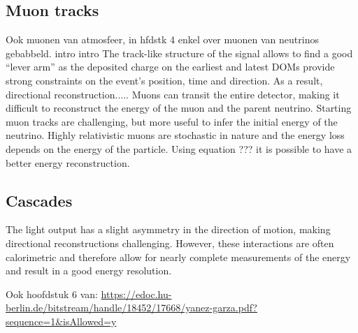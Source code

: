 \subsection{Muon tracks}
Ook muonen van atmosfeer, in hfdstk 4 enkel over muonen van neutrinos gebabbeld.
intro intro
The track-like structure of the signal allows to find a good ``lever arm'' as the deposited charge on the earliest and latest DOMs provide strong constraints on the event's position, time and direction. As a result, directional reconstruction..... Muons can transit the entire detector, making it difficult to reconstruct the energy of the muon and the parent neutrino. Starting muon tracks are challenging, but more useful to infer the initial energy of the neutrino. Highly relativistic muons are stochastic in nature and the energy loss depends on the energy of the particle. Using equation ??? it is possible to have a better energy reconstruction.
\subsection{Cascades}
The light output has a slight asymmetry in the direction of motion, making directional reconstructions challenging. However, these interactions are often calorimetric and therefore allow for nearly complete measurements of the energy and result in a good energy resolution.




Ook hoofdstuk 6 van: \url{https://edoc.hu-berlin.de/bitstream/handle/18452/17668/yanez-garza.pdf?sequence=1&isAllowed=y}